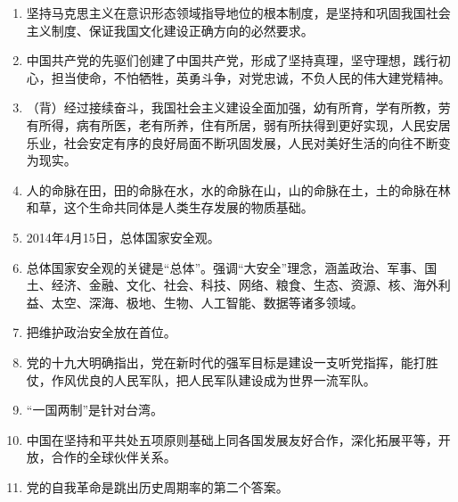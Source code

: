 \documentclass[12pt, a4paper, oneside]{ctexbook}
\begin{document}
\begin{enumerate}
\item 坚持马克思主义在意识形态领域指导地位的根本制度，是坚持和巩固我国社会主义制度、保证我国文化建设正确方向的必然要求。
\item 中国共产党的先驱们创建了中国共产党，形成了坚持真理，坚守理想，践行初心，担当使命，不怕牺牲，英勇斗争，对党忠诚，不负人民的伟大建党精神。
\item （背）经过接续奋斗，我国社会主义建设全面加强，幼有所育，学有所教，劳有所得，病有所医，老有所养，住有所居，弱有所扶得到更好实现，人民安居乐业，社会安定有序的良好局面不断巩固发展，人民对美好生活的向往不断变为现实。
\item 人的命脉在田，田的命脉在水，水的命脉在山，山的命脉在土，土的命脉在林和草，这个生命共同体是人类生存发展的物质基础。
\item 2014年4月15日，总体国家安全观。
\item 总体国家安全观的关键是“总体”。强调“大安全”理念，涵盖政治、军事、国土、经济、金融、文化、社会、科技、网络、粮食、生态、资源、核、海外利益、太空、深海、极地、生物、人工智能、数据等诸多领域。
\item 把维护政治安全放在首位。
\item 党的十九大明确指出，党在新时代的强军目标是建设一支听党指挥，能打胜仗，作风优良的人民军队，把人民军队建设成为世界一流军队。
\item “一国两制”是针对台湾。
\item 中国在坚持和平共处五项原则基础上同各国发展友好合作，深化拓展平等，开放，合作的全球伙伴关系。
\item 党的自我革命是跳出历史周期率的第二个答案。
\end{enumerate}
\end{document}
